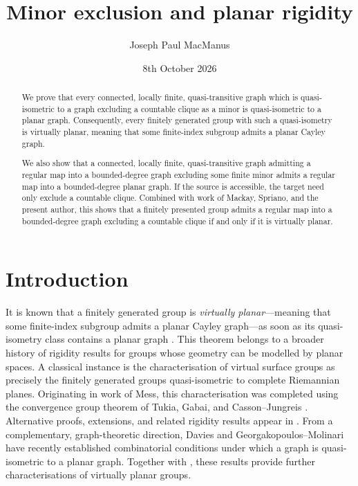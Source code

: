 \documentclass[a4paper]{amsart}
\title{Minor exclusion and planar rigidity}
\author{Joseph Paul MacManus}
\date{8th October 2026}
\begin{document}
\begin{abstract}
    We prove that every connected, locally finite, quasi-transitive graph which is quasi-isometric to a graph excluding a countable clique as a minor is quasi-isometric to a planar graph. Consequently, every finitely generated group with such a quasi-isometry is virtually planar, meaning that some finite-index subgroup admits a planar Cayley graph. 
    
    We also show that a connected, locally finite, quasi-transitive graph admitting a regular map into a bounded-degree graph excluding some finite minor admits a regular map into a bounded-degree planar graph. If the source is accessible, the target need only exclude a countable clique. Combined with work of Mackay, Spriano, and the present author, this shows that a finitely presented group admits a regular map into a bounded-degree graph excluding a countable clique if and only if it is virtually planar.
\end{abstract}

\maketitle





\section{Introduction}



It is known that a finitely generated group is \emph{virtually planar}---meaning that some finite-index subgroup admits a planar Cayley graph---as soon as its quasi-isometry class contains a planar graph \cite{macmanus2023accessibility}. This theorem belongs to a broader history of rigidity results for groups whose geometry can be modelled by planar spaces. A classical instance is the characterisation of virtual surface groups as precisely the finitely generated groups quasi-isometric to complete Riemannian planes. Originating in work of Mess, this characterisation was completed using the convergence group theorem of Tukia, Gabai, and Casson--Jungreis \cites{mess1988seifert,tukia1988homeomorphic,gabai1992convergence,casson1994convergence}. Alternative proofs, extensions, and related rigidity results appear in \cites{maillot2001quasi,bowditch2004planar,papasoglu2005quasi,macmanus2023accessibility,macmanus2024note,macmanus2025fat,macmanus2025vertex,mackay2026almost}. 
From a complementary, graph-theoretic direction, Davies \cite{davies2025string} and Georgakopoulos–Molinari \cite{georgakopoulos2026quasi} have recently established combinatorial conditions under which a graph is quasi-isometric to a planar graph. Together with \cite{macmanus2023accessibility}, these results provide further characterisations of virtually planar groups.
\end{document}
